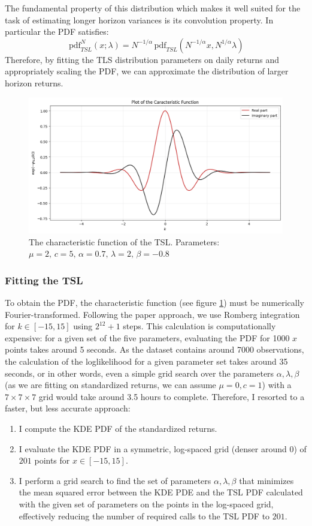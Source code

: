 \documentclass[12pt]{article}
\newcommand{\pdf}{\,\text{pdf}}
\begin{document}
    The fundamental property of this distribution which makes it well suited for the task of estimating longer horizon variances is its convolution property.
    In particular the PDF satisfies:
   \begin{equation}
        \pdf^N_{TSL}(x; \lambda) = N^{-1/\alpha} \pdf_{TSL}\left(  N^{-1/\alpha} x,  N^{1/\alpha}\lambda\right)\label{eq:scaling}
   \end{equation}
    Therefore, by fitting the TLS distribution parameters on daily returns and appropriately scaling the PDF, we can approximate the distribution of larger horizon returns.

    \begin{figure}[h!]
        \centering
        \includegraphics[width=0.6 \linewidth]{char_func}
        \caption{The characteristic function of the TSL. Parameters: $\mu=2, \,c=5,\, \alpha = 0.7, \, \lambda = 2,\, \beta =-0.8$}
        \label{fig:char_func}
    \end{figure}

    \subsubsection{Fitting the TSL}
    To obtain the PDF, the characteristic function (see figure \ref{fig:char_func}) must be numerically Fourier-transformed.
    Following the paper approach, we use Romberg integration for $k \in [-15, 15]$ using $2^{12}+1$ steps.
    This calculation is computationally expensive: for a given set of the five parameters, evaluating the PDF for 1000 $x$ points takes around 5 seconds.
    As the dataset contains around 7000 observations, the calculation of the loglikelihood for a given parameter set takes around 35 seconds, or in other words,
    even a simple grid search over the parameters $\alpha, \lambda, \beta$ (as we are fitting on standardized returns, we can assume $\mu=0, c=1$) with a $7\times 7\times 7$ grid would take around 3.5 hours to complete.
    Therefore, I resorted to a faster, but less accurate approach:
    \begin{enumerate}
        \item I compute the KDE PDF of the standardized returns.
        \item I evaluate the KDE PDF in a symmetric, log-spaced grid (denser around $0$) of $201$ points for $x\in [-15,15]$.
        \item I perform a grid search to find the set of parameters $\alpha, \lambda, \beta$ that minimizes the mean squared error
            between the KDE PDE and the TSL PDF calculated with the given set of parameters on the points in the log-spaced grid,
            effectively reducing the number of required calls to the TSL PDF to $201$.
    \end{enumerate}
\end{document}

